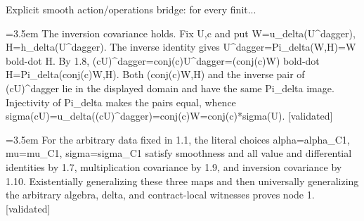 \documentclass{article}
\newcommand{\step}[1]{\par\noindent\hangindent=3.5em\hangafter=1%
  \makebox[3.5em][l]{\textbf{#1.}}}
\newcommand{\steptag}[1]{\hfill{\small\textsf{[#1]}}}
\begin{document}
\begin{proofbox}{Explicit smooth action/operations bridge: for every finit...}
\step{1.10} The inversion covariance holds. Fix U,c and put W=u\_delta(U\textasciicircum{}dagger), H=h\_delta(U\textasciicircum{}dagger). The inverse identity gives U\textasciicircum{}dagger=Pi\_delta(W,H)=W bold-dot H. By 1.8, (cU)\textasciicircum{}dagger=conj(c)U\textasciicircum{}dagger=(conj(c)W) bold-dot H=Pi\_delta(conj(c)W,H). Both (conj(c)W,H) and the inverse pair of (cU)\textasciicircum{}dagger lie in the displayed domain and have the same Pi\_delta image. Injectivity of Pi\_delta makes the pairs equal, whence sigma(cU)=u\_delta((cU)\textasciicircum{}dagger)=conj(c)W=conj(c)*sigma(U). \steptag{validated} \\[4pt]
\step{1.11} For the arbitrary data fixed in 1.1, the literal choices alpha=alpha\_C1, mu=mu\_C1, sigma=sigma\_C1 satisfy smoothness and all value and differential identities by 1.7, multiplication covariance by 1.9, and inversion covariance by 1.10. Existentially generalizing these three maps and then universally generalizing the arbitrary algebra, delta, and contract-local witnesses proves node 1. \steptag{validated} \\[4pt]
\end{proofbox}
\end{document}
